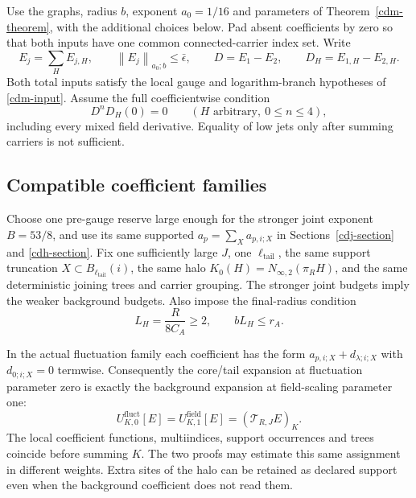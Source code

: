 \documentclass[11pt]{article}
\theoremstyle{remark}
\newcommand{\norm}[1]{\left\|#1\right\|}
\begin{document}
Use the graphs, radius $b$, exponent $a_0=1/16$ and parameters
of Theorem~\ref{cdm-theorem}, with the additional choices below.
Pad absent coefficients by zero so that both inputs have one
common connected-carrier index set. Write
\begin{equation}
 E_j=\sum_HE_{j,H},\qquad
 \norm{E_j}_{a_0;b}\le\bar\epsilon,\qquad
 D=E_1-E_2,\qquad D_H=E_{1,H}-E_{2,H}.
 \label{cdq-inputs}
\end{equation}
Both total inputs satisfy the local gauge and logarithm-branch
hypotheses of \eqref{cdm-input}. Assume the full coefficientwise
condition
\begin{equation}
 D^nD_H(0)=0\qquad(H\text{ arbitrary},\ 0\le n\le4),
 \label{cdq-common-jets}
\end{equation}
including every mixed field derivative. Equality of low jets
only after summing carriers is not sufficient.

\subsection{Compatible coefficient families}
\label{cdq-compatibility-section}

Choose one pre-gauge reserve large enough for the stronger
joint exponent $B=53/8$, and use its same supported
$a_p=\sum_Xa_{p,i;X}$ in Sections~\ref{cdj-section} and
\ref{cdh-section}. Fix one sufficiently large $J$, one
$\ell_{\mathrm{tail}}$, the same support truncation
$X\subset B_{\ell_{\mathrm{tail}}}(i)$, the same halo
$K_0(H)=N_{\infty,2}(\pi_RH)$, and the same deterministic
joining trees and carrier grouping. The stronger joint
budgets imply the weaker background budgets.
Also impose the final-radius condition
\begin{equation}
 L_H=\frac{R}{8C_A}\ge2,\qquad bL_H\le r_A.
 \label{cdq-high-disk}
\end{equation}

In the actual fluctuation family each coefficient has the
form $a_{p,i;X}+d_{\lambda;i;X}$ with
$d_{0;i;X}=0$ termwise. Consequently the core/tail expansion
at fluctuation parameter zero is exactly the background
expansion at field-scaling parameter one:
\begin{equation}
 U^{\mathrm{fluct}}_{K,0}[E]
   =U^{\mathrm{field}}_{K,1}[E]
   =(\mathcal T_{R,J}E)_K.
 \label{cdq-background-identity}
\end{equation}
The local coefficient functions, multiindices, support
occurrences and trees coincide before summing $K$.
The two proofs may estimate this same assignment in different
weights. Extra sites of the halo can be retained as declared
support even when the background coefficient does not read them.
\end{document}
